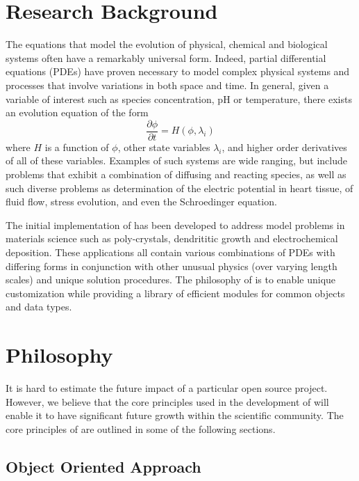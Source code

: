 \section{Research Background}

The equations that model the evolution of physical, chemical and
biological systems often have a remarkably universal form. Indeed,
partial differential equations (PDEs) have proven necessary to model
complex physical systems and processes that involve variations in both
space and time.  In general, given a variable of interest such as
species concentration, pH or temperature, there exists an evolution
equation of the form
\begin{equation}
  \frac{\partial \phi}{\partial t} = H(\phi, \lambda_i)
  \label{eqn:general-equation}
\end{equation}
where $H$ is a function of $\phi$, other state variables $\lambda_i$,
and higher order derivatives of all of these variables. Examples of
such systems are wide ranging, but include problems that exhibit a
combination of diffusing and reacting species, as well as such diverse
problems as determination of the electric potential in heart tissue,
of fluid flow, stress evolution, and even the Schroedinger equation.

The initial implementation of \FiPy{} has been developed to address
model problems in materials science such as poly-crystals, dendrititic
growth and electrochemical deposition. These applications all contain
various combinations of PDEs with differing forms in conjunction with
other unusual physics (over varying length scales) and unique solution
procedures. The philosophy of \FiPy{} is to enable unique
customization while providing a library of efficient modules for
common objects and data types.

\section{\FiPy{} Philosophy}

It is hard to estimate the future impact of a particular open source
project. However, we believe that the core principles used in the
development of \FiPy{} will enable it to have significant future
growth within the scientific community. The core principles of \FiPy{}
are outlined in some of the following sections.

\subsection{Object Oriented Approach}

